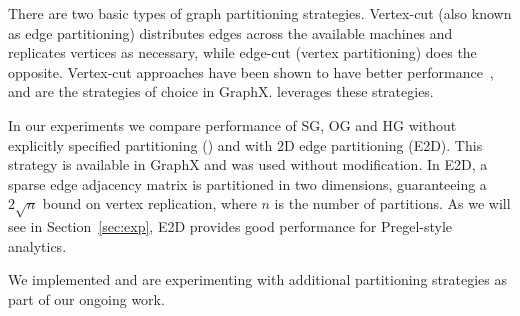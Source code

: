There are two basic types of graph partitioning strategies. Vertex-cut
(also known as edge partitioning) distributes edges across the
available machines and replicates vertices as necessary, while
edge-cut (vertex partitioning) does the opposite.  Vertex-cut
approaches have been shown to have better
performance~\cite{Gonzalez2012}, and are the strategies of choice in
GraphX.  \ql leverages these strategies.

In our experiments we compare performance of SG, OG and HG without
explicitly specified partitioning ()  and
with 2D edge partitioning (E2D).  This strategy is available in GraphX
and was used without modification.  In E2D, a sparse edge adjacency
matrix is partitioned in two dimensions, guaranteeing a $2 \sqrt{n}$
bound on vertex replication, where $n$ is the number of partitions. As
we will see in Section~\ref{sec:exp}, E2D provides good
performance for Pregel-style analytics.

We implemented and are experimenting with additional partitioning
strategies as part of our ongoing work.
